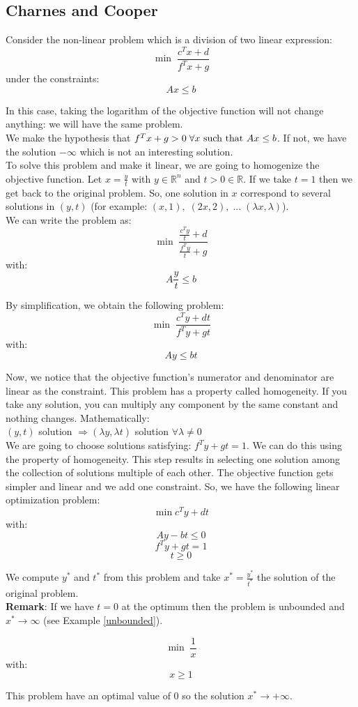 \subsection{Charnes and Cooper}

Consider the non-linear problem which is a division of two linear expression: 
$$ \min \; \frac{c^{T}x + d}{f^{T}x + g}$$
under the constraints: 
$$ Ax \leq b$$

In this case, taking the logarithm of the objective function will not change anything: we will have the same problem. \\

We make the hypothesis that $f^{T}x+g > 0 \; \forall x \textnormal{ such that } Ax \leq b$. If not, we have the solution $-\infty$ which is not an interesting solution. \\

To solve this problem and make it linear, we are going to homogenize the objective function. Let $x = \frac{y}{t}$ with $y \in \mathbb{R}^{n}$ and $t >0 \in \mathbb{R}$. If we take $t=1$ then we get back to the original problem. So, one solution in $x$ correspond to several solutions in $(y,t)$ (for example: $(x,1), \; (2x,2), \; ... \; (\lambda x,\lambda)$).\\
We can write the problem as: 
$$ \min \; \frac{\frac{c^{T}y}{t}+d}{\frac{f^{T}y}{t}+g} $$
with: 
$$ A\frac{y}{t} \leq b$$

By simplification, we obtain the following problem: 
$$ \min \; \frac{c^{T}y + dt}{f^{T}y + gt}$$
with:
$$Ay \leq bt$$

Now, we notice that the objective function's numerator and denominator are linear as the constraint. This problem has a property called homogeneity. If you take any solution, you can multiply any component by the same constant and nothing changes. Mathematically:\\
$(y,t)$ solution $\Rightarrow (\lambda y, \lambda t)$ solution $\forall \lambda \neq 0$ \\

We are going to choose solutions satisfying: $f^{T}y+gt=1$. We can do this using the property of homogeneity. This step results in selecting one solution among the collection of solutions multiple of each other. The objective function gets simpler and linear and we add one constraint. So, we have the following linear optimization problem: 
$$ \min c^{T}y + dt$$
with: 
$$ Ay-bt \leq 0$$
$$f^{T}y+gt = 1$$
$$t \geq 0$$

We compute $y^{*}$ and $t^{*}$ from this problem and take $x^{*} = \frac{y^{*}}{t^{*}}$ the solution of the original problem.\\ 
\textbf{Remark}: If we have $t=0$ at the optimum then the problem is unbounded and $x^{*} \rightarrow \infty$ (see Example \ref{unbounded}).\\
\begin{example}
\label{unbounded}
\begin{leftbar}
$$ \min \; \frac{1}{x}$$
with: 
$$x \geq 1$$ 

This problem have an optimal value of 0 so the solution $x^{*} \rightarrow + \infty$. 
\end{leftbar}
\end{example}

